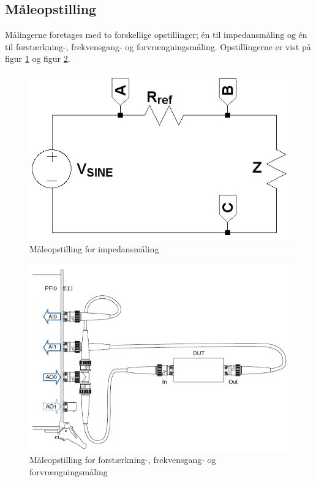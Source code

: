 \subsection*{Måleopstilling}
Målingerne foretages med to forskellige opstillinger; én til impedansmåling og én til forstærkning-, frekvensgang- og forvrængningsmåling. Opstillingerne er vist på figur \ref{fig:maaleop-imp} og figur \ref{fig:maaleop-thd}.

\begin{figure}[h]
\centering
\includegraphics[scale=0.4]{maalerapporter/forforstaerker/impedansopstilling-forforstaerker.png}
\caption{Måleopstilling for impedansmåling}
\label{fig:maaleop-imp}
\end{figure}

\begin{figure}[h]
\centering
\includegraphics[scale=0.4]{maalerapporter/forforstaerker/maaleopstilling-thd-forforstaerker.png}
\caption{Måleopstilling for forstærkning-, frekvensgang- og forvrængningsmåling}
\label{fig:maaleop-thd}
\end{figure}

